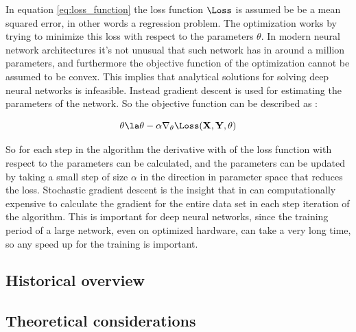 In equation \eqref{eq:loss_function} the loss function $\Loss$ is assumed be be a mean squared error, in other words a regression problem. The optimization works by trying to minimize this loss with respect to the parameters $\theta$. In modern neural network architectures it's not unusual that such network has in around a million parameters, and furthermore the objective function of the optimization cannot be assumed to be convex. This implies that analytical solutions for solving deep neural networks is infeasible. Instead gradient descent is used for estimating the parameters of the network. So the objective function can be described as \parencite{goodfellow_deep_2016}:

\begin{equation}
    \theta \la \theta - \alpha \nabla_{\theta} \Loss(\textbf{X}, \textbf{Y}, \theta)
\end{equation}

So for each step in the algorithm the derivative with of the loss function with respect to the parameters can be calculated, and the parameters can be updated by taking a small step of size $\alpha$ in the direction in parameter space that reduces the loss. Stochastic gradient descent is the insight that in can computationally expensive to calculate the gradient for the entire data set in each step iteration of the algorithm. This is important for deep neural networks, since the training period of a large network, even on optimized hardware, can take a very long time, so any speed up for the training is important. 





\subsection{Historical overview}

\subsection{Theoretical considerations}




